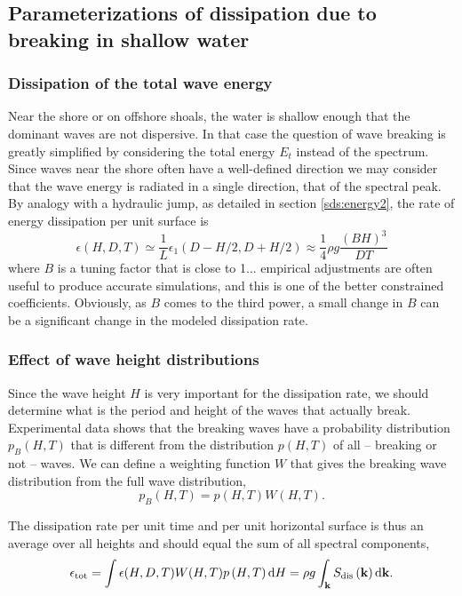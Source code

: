 \subsection{Parameterizations of dissipation due to breaking in shallow water}
\subsubsection{Dissipation of the total wave energy\label{sds:energy}}
Near the shore or on offshore shoals, the water is shallow enough that the dominant waves are not dispersive. In that 
case the question of wave breaking is greatly simplified by considering the total energy $E_t$ instead of the spectrum. 
Since waves near the shore often have a well-defined direction we may consider that the wave energy is radiated in a single direction, 
that of the spectral peak. 
By analogy with a hydraulic jump, as detailed in section  \ref{sds:energy2},
the rate of energy dissipation per unit surface is 
\begin{equation}
    \epsilon(H,D,T) \simeq \frac{1}{L}\epsilon_1(D-H/2,D+H/2) \approx \frac{1}{4}  \rho g \frac{\left(B H \right)^3}{D T}
\label{epsi_shallow_mean}
\end{equation}
where $B$ is a tuning factor that is close to 1... empirical adjustments are often useful to produce accurate simulations, and this is one of the better constrained 
coefficients. Obviously, as $B$ comes to the third power, a small change in $B$ can be a significant change in the modeled dissipation rate. 




\subsubsection{Effect of wave height distributions}
Since the wave height $H$ is very important for the dissipation rate, we should 
determine what is the period and height of the waves that actually break. Experimental data shows that the breaking waves have a probability distribution 
$p_B(H,T)$ that is different from the distribution $p(H,T)$ of all -- breaking or not -- waves. We can define 
a weighting function $W$ that gives the breaking wave distribution from the full wave distribution,
\begin{equation}
 p_B(H,T)=p(H,T)W(H,T).
\end{equation}

The dissipation rate per unit time and per unit horizontal surface is thus an average over all heights and should equal the sum of all spectral 
components,
\begin{equation}
  \epsilon_{\mathrm{tot}}=
  \int \epsilon(H,D,T) W(H,T) p\left(H,T\right) \mathrm{d} H=\rho g  \int_{\mathbf{k}} S_{\mathrm{dis}}\left(\mathbf{k}\right) \mathrm{d} \mathbf{k} .\label{Sds_tot_BJ}
\end{equation}


